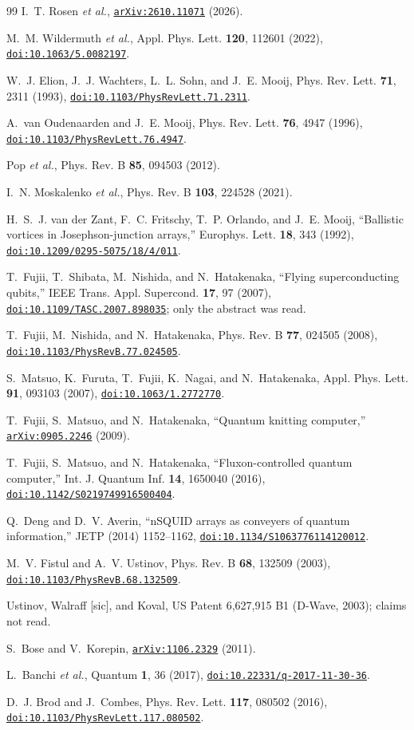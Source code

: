 \documentclass[10pt,twocolumn,letterpaper]{article}
\newcommand{\doi}[1]{\href{https://doi.org/#1}{\nolinkurl{doi:#1}}}
\newcommand{\arxiv}[1]{\href{https://arxiv.org/abs/#1}{\nolinkurl{arXiv:#1}}}
\begin{document}
\begin{thebibliography}{99}
I.~T. Rosen \emph{et al.}, \arxiv{2610.11071} (2026).

M.~M. Wildermuth \emph{et al.}, Appl. Phys. Lett. \textbf{120}, 112601 (2022), \doi{10.1063/5.0082197}.

W.~J. Elion, J.~J. Wachters, L.~L. Sohn, and J.~E. Mooij, Phys. Rev. Lett. \textbf{71}, 2311 (1993),
\doi{10.1103/PhysRevLett.71.2311}.

A.~van Oudenaarden and J.~E. Mooij, Phys. Rev. Lett. \textbf{76}, 4947 (1996), \doi{10.1103/PhysRevLett.76.4947}.

Pop \emph{et al.}, Phys. Rev. B \textbf{85}, 094503 (2012).

I.~N. Moskalenko \emph{et al.}, Phys. Rev. B \textbf{103}, 224528 (2021).

H.~S.~J. van der Zant, F.~C. Fritschy, T.~P. Orlando, and J.~E. Mooij, ``Ballistic vortices in Josephson-junction
arrays,'' Europhys. Lett. \textbf{18}, 343 (1992), \doi{10.1209/0295-5075/18/4/011}.

T.~Fujii, T.~Shibata, M.~Nishida, and N.~Hatakenaka, ``Flying superconducting qubits,'' IEEE Trans. Appl. Supercond.
\textbf{17}, 97 (2007), \doi{10.1109/TASC.2007.898035}; only the abstract was read.

T.~Fujii, M.~Nishida, and N.~Hatakenaka, Phys. Rev. B \textbf{77}, 024505 (2008), \doi{10.1103/PhysRevB.77.024505}.

S.~Matsuo, K.~Furuta, T.~Fujii, K.~Nagai, and N.~Hatakenaka, Appl. Phys. Lett. \textbf{91}, 093103 (2007),
\doi{10.1063/1.2772770}.

T.~Fujii, S.~Matsuo, and N.~Hatakenaka, ``Quantum knitting computer,'' \arxiv{0905.2246} (2009).

T.~Fujii, S.~Matsuo, and N.~Hatakenaka, ``Fluxon-controlled quantum computer,'' Int. J. Quantum Inf. \textbf{14},
1650040 (2016), \doi{10.1142/S0219749916500404}.

Q.~Deng and D.~V. Averin, ``nSQUID arrays as conveyers of quantum information,'' JETP (2014) 1152--1162,
\doi{10.1134/S1063776114120012}.

M.~V. Fistul and A.~V. Ustinov, Phys. Rev. B \textbf{68}, 132509 (2003), \doi{10.1103/PhysRevB.68.132509}.

Ustinov, Walraff [sic], and Koval, US Patent 6,627,915 B1 (D-Wave, 2003); claims not read.

S.~Bose and V.~Korepin, \arxiv{1106.2329} (2011).

L.~Banchi \emph{et al.}, Quantum \textbf{1}, 36 (2017), \doi{10.22331/q-2017-11-30-36}.

D.~J. Brod and J.~Combes, Phys. Rev. Lett. \textbf{117}, 080502 (2016), \doi{10.1103/PhysRevLett.117.080502}.

\end{thebibliography}
\end{document}
